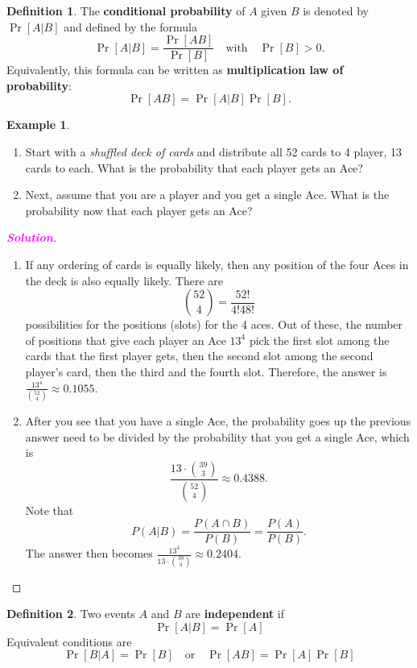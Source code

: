 \documentclass[12pt,openany]{book}
\theoremstyle{definition}
\newtheorem{definition}{Definition}[chapter]
\newtheorem{example}{Example}[chapter]
\newcommand{\dispsty}{\displaystyle}
\newcommand{\sol}{\textcolor{magenta}{\bf Solution}}
\begin{document}
	\begin{tcolorbox}[colback=white,colframe=defcolor,arc=5pt,title={\color{white}\bf Conditional Probability}]
		\begin{definition}
			The \textbf{conditional probability} of $A$ given $B$ is denoted by $\Pr[A|B]$ and defined by the formula
			\[
			\Pr[A|B] = \frac{\Pr[AB]}{\Pr[B]}\quad\text{with}\quad\Pr[B]>0.
			\] Equivalently, this formula can be written as \textbf{multiplication law of probability}:\[
			\Pr[AB] = \Pr[A|B]\Pr[B].
			\]
		\end{definition}
	\end{tcolorbox}
	\begin{example}
	\ \begin{enumerate}[(1)]
		\item Start with a \textit{shuffled deck of cards} and distribute all 52 cards to 4 player, 13 cards to each. What is the probability that each player gets an Ace?
		\item Next, assume that you are a player and you get a single Ace. What is the probability now that each player gets an Ace?
	\end{enumerate}
	\begin{proof}[\sol]
		\ \begin{enumerate}[(1)]
			\item If any ordering of cards is equally likely, then any position of the four Aces in the deck is also equally likely. There are \[
			\binom{52}{4}=\frac{52!}{4!48!}
			\] possibilities for the positions (slots) for the 4 aces. Out of these, the number of positions that give each player an Ace $13^4$ pick the first slot among the cards that the first player gets, then the second slot among the second player's card, then the third and the fourth slot. Therefore, the answer is $
			\frac{13^4}{\binom{52}{4}}\approx0.1055.
			$
			\item After you see that you have a single Ace, the probability goes up the previous answer need to be divided by the probability that you get a single Ace, which is \[
			\frac{\dispsty13\cdot\binom{39}{3}}{\dispsty\binom{52}{4}}\approx0.4388.
			\] Note that \[
			P(A|B)=\frac{P(A\cap B)}{P(B)}=\frac{P(A)}{P(B)}.
			\] The answer then becomes $
			\frac{13^4}{13\cdot\binom{39}{3}}\approx0.2404.
			$
		\end{enumerate}
	\end{proof}
\end{example}
	\vspace{10pt}
	\begin{tcolorbox}[colback=white,colframe=defcolor,arc=5pt,title={\color{white}\bf Independence}]
		\begin{definition}
			Two events $A$ and $B$ are \textbf{independent} if \[
			\Pr[A|B] = \Pr[A]
			\] Equivalent conditions are \[
			\Pr[B|A] = \Pr[B]\quad\text{or}\quad \Pr[AB]=\Pr[A]\Pr[B]
			\]
		\end{definition}
	\end{tcolorbox}
\end{document}
